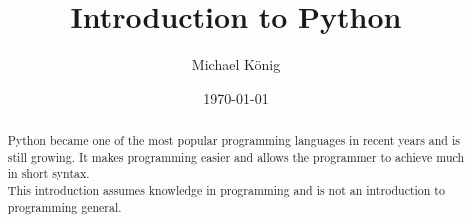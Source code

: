 \documentclass[11pt, a4paper]{article}
\title{Introduction to Python}
\author{Michael König}
\date{\today}
\begin{document}
  \begin{titlingpage}
    \maketitle
    \thispagestyle{firstpage}
    
    \begin{abstract}
      \noindent
      Python became one of the most popular programming languages in recent years and is still growing. It makes programming easier and allows the programmer to achieve much in short syntax.\\
      This introduction assumes knowledge in programming and is not an introduction to programming general.
    \end{abstract}
  \end{titlingpage}

  \tableofcontents
  \newpage
  \pagestyle{content}
  \setcounter{page}{1}

  
\end{document}
